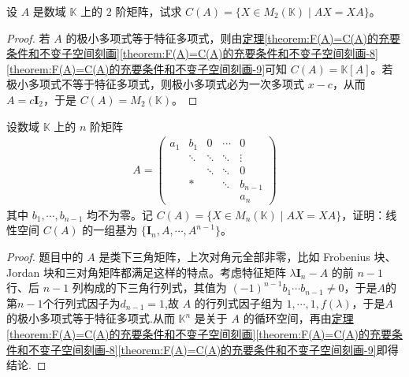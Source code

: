 \documentclass[../../main.tex]{subfiles}%
\begin{document}
\begin{example}
设 $A$ 是数域 $\mathbb{K}$ 上的 $2$ 阶矩阵，试求 $C(A)=\{X\in M_2(\mathbb{K})\mid AX = XA\}$。
\end{example}
\begin{proof}
若 $A$ 的极小多项式等于特征多项式，则由\hyperref[theorem:F(A)=C(A)的充要条件和不变子空间刻画]{定理\ref{theorem:F(A)=C(A)的充要条件和不变子空间刻画}\ref{theorem:F(A)=C(A)的充要条件和不变子空间刻画-8}\ref{theorem:F(A)=C(A)的充要条件和不变子空间刻画-9}}可知 $C(A)=\mathbb{K}[A]$。若极小多项式不等于特征多项式，则极小多项式必为一次多项式 $x - c$，从而 $A = c\boldsymbol{I}_2$，于是 $C(A)=M_2(\mathbb{K})$。
\end{proof}

\begin{example}
设数域 $\mathbb{K}$ 上的 $n$ 阶矩阵
\begin{align*}
A=\begin{pmatrix}
a_1 & b_1 & 0 & \cdots & 0 \\
& \ddots & \ddots & \ddots & \vdots \\
& & \ddots & \ddots & 0 \\
& * & & \ddots & b_{n - 1} \\
& & & & a_n
\end{pmatrix}
\end{align*}
其中 $b_1,\cdots,b_{n - 1}$ 均不为零。记 $C(A)=\{X\in M_n(\mathbb{K})\mid AX = XA\}$，证明：线性空间 $C(A)$ 的一组基为 $\{\boldsymbol{I}_n,A,\cdots,A^{n - 1}\}$。
\end{example}
\begin{proof}
题目中的 $A$ 是类下三角矩阵，上次对角元全部非零，比如 Frobenius 块、Jordan 块和三对角矩阵都满足这样的特点。考虑特征矩阵 $\lambda\boldsymbol{I}_n - A$ 的前 $n - 1$ 行、后 $n - 1$ 列构成的下三角行列式，其值为 $(-1)^{n - 1}b_1\cdots b_{n - 1}\neq 0$，于是$A$的第$n-1$个行列式因子为$d_{n-1}=1$,故 $A$ 的行列式因子组为 $1,\cdots,1,f(\lambda)$，于是$A$的极小多项式等于特征多项式.从而 $\mathbb{K}^n$ 是关于 $A$ 的循环空间，再由\hyperref[theorem:F(A)=C(A)的充要条件和不变子空间刻画]{定理\ref{theorem:F(A)=C(A)的充要条件和不变子空间刻画}\ref{theorem:F(A)=C(A)的充要条件和不变子空间刻画-8}\ref{theorem:F(A)=C(A)的充要条件和不变子空间刻画-9}}即得结论.
\end{proof}
\end{document}
